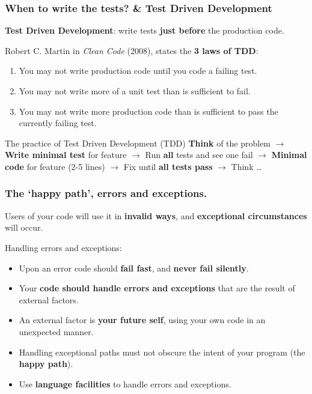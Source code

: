 \documentclass{beamer} %
\newcommand\emc[1]{\textcolor{midred}{\textbf{#1}}}
\begin{document}
\begin{frame}
\frametitle{When to write the tests? \& Test Driven Development}

\emc{Test Driven Development}: write tests \emc{just before} the production code.

\vspace{2mm}
Robert C. Martin in \emph{Clean Code} (2008), states the \emc{3 laws of TDD}:
\begin{enumerate}
	\item You may not write production code until you code a failing test.
	\item You may not write more of a unit test than is sufficient to fail.
	\item You may not write more production code than is sufficient to pass the currently failing test.
\end{enumerate}

\vspace{2mm}
\begin{block}{The practice of Test Driven Development (TDD)}
\emc{Think} of the problem $\rightarrow$ \emc{Write minimal test} for feature $\rightarrow$ Run \emc{all} tests and see one fail $\rightarrow$ \emc{Minimal code} for feature (2-5 lines) $\rightarrow$ Fix until \emc{all tests pass} $\rightarrow$ Think \ldots
\end{block}

\end{frame}


\begin{frame}
\frametitle{The `happy path', errors and exceptions.}

Users of your code will use it in \emc{invalid ways}, and \emc{exceptional circumstances} will occur.

\vspace{3mm}
Handling errors and exceptions:
\begin{itemize}
	\item Upon an error code should \emc{fail fast}, and \emc{never fail silently}.
	\item Your \emc{code should handle errors and exceptions} that are the result of external factors.
	\item An external factor is \emc{your future self}, using your own code in an unexpected manner.
	\item Handling exceptional paths must not obscure the intent of your program (the \emc{happy path}).
	\item Use \emc{language facilities} to handle errors and exceptions.
\end{itemize}

\end{frame}
\end{document}
